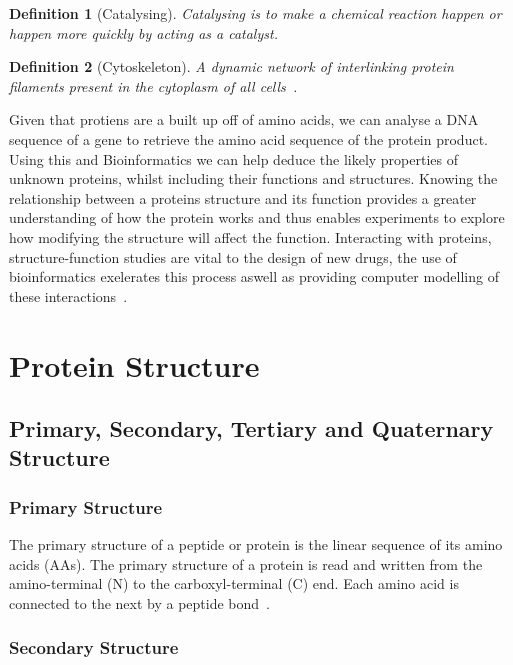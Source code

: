 \documentclass{report}
\newtheorem{definition}{Definition}[section]
\begin{document}
\begin{definition}[Catalysing]
    Catalysing is to make a chemical reaction happen or happen more quickly by acting as a catalyst.
\end{definition}

\begin{definition}[Cytoskeleton]
    A dynamic network of interlinking protein filaments present in the cytoplasm of all cells~\cite{zvelebil_understanding_2008}. 
\end{definition}

Given that protiens are a built up off of amino acids, we can analyse a DNA sequence of a gene to retrieve the amino acid sequence of the protein product. Using this and Bioinformatics we can help deduce the likely properties of unknown proteins, whilst including their functions and structures. Knowing the relationship between a proteins structure and its function provides a greater understanding of how the protein works and thus enables experiments to explore how modifying the structure will affect the function. Interacting with proteins, structure-function studies are vital to the design of new drugs, the use of bioinformatics exelerates this process aswell as providing computer modelling of these interactions~\cite{zvelebil_understanding_2008}.

\section{Protein Structure}

\subsection{Primary, Secondary, Tertiary and Quaternary Structure}

\subsubsection{Primary Structure}

The primary structure of a peptide or protein is the linear sequence of its amino acids (AAs). The primary structure of a protein is read and written from the amino-terminal (N) to the carboxyl-terminal (C) end. Each amino acid is connected to the next by a peptide bond~\cite{noauthor_levels_nodate}.

\subsubsection{Secondary Structure}
\end{document}
